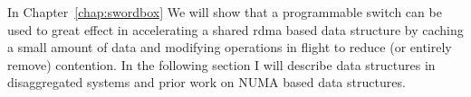\documentclass[12pt]{ucsddissertation}
\begin{document}
In Chapter~\ref{chap:swordbox} We will show that a programmable switch can be used to great effect
in accelerating a shared rdma based data structure by caching a small amount of data and modifying
operations in flight to reduce (or entirely remove) contention. In the following section I will
describe data structures in disaggregated systems and prior work on NUMA based data structures.




\end{document}

